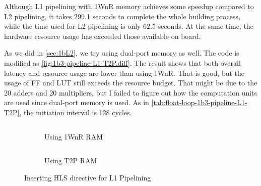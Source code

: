 Although L1 pipelining with 1WnR memory achieves some speedup compared to L2 pipelining, it takes 299.1 seconds to complete the whole building process, while the time used for L2 pipelining is only 62.5 seconds.
At the same time, the hardware resource usage has exceeded those available on board.

As we did in \autoref{sec:1bL2}, we try using dual-port memory as well.
The code is modified as \autoref{fig:1b3-pipeline-L1-T2P.diff}.
The result shows that both overall latency and resource usage are lower than using 1WnR.
That is good, but the usage of FF and LUT still exceeds the resource budget.
That might be due to the 20 adders and 20 multipliers, but I failed to figure out how the computation units are used since dual-port memory is used.
As in \autoref{tab:float-loop-1b3-pipeline-L1-T2P}, the initiation interval is 128 cycles.


\begin{figure}[ht!]

    \begin{subfigure}{\textwidth}
        \centering
        \inputminted[firstline=3]{diff}{program/1b3-pipeline-L1-1WnR.diff}
        \caption{Using 1WnR RAM}
        \label{fig:1b3-pipeline-L1-1WnR.diff}
    \end{subfigure}

    \begin{subfigure}{\textwidth}
        \centering
        \inputminted[firstline=3]{diff}{program/1b3-pipeline-L1-T2P.diff}
        \caption{Using T2P RAM}
        \label{fig:1b3-pipeline-L1-T2P.diff}
    \end{subfigure}

    \caption{Inserting HLS directive for L1 Pipelining}

\end{figure}
